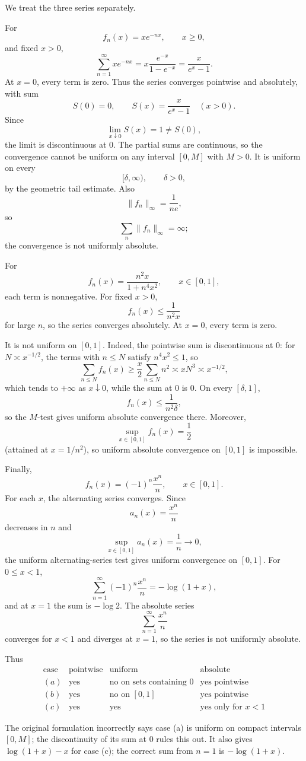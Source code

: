 \begin{solution}
We treat the three series separately.

For
\[
f_n(x)=xe^{-nx},
\qquad x\ge0,
\]
and fixed \(x>0\),
\[
\sum_{n=1}^{\infty}xe^{-nx}
=
x\frac{e^{-x}}{1-e^{-x}}
=
\frac{x}{e^x-1}.
\]
At \(x=0\), every term is zero. Thus the series converges pointwise and absolutely, with sum
\[
S(0)=0,
\qquad
S(x)=\frac{x}{e^x-1}\quad(x>0).
\]
Since
\[
\lim_{x\downarrow0}S(x)=1\neq S(0),
\]
the limit is discontinuous at \(0\). The partial sums are continuous, so the convergence
cannot be uniform on any interval \([0,M]\) with \(M>0\). It is uniform on every
\[
[\delta,\infty),
\qquad \delta>0,
\]
by the geometric tail estimate. Also
\[
\|f_n\|_\infty=\frac1{ne},
\]
so
\[
\sum_n\|f_n\|_\infty=\infty;
\]
the convergence is not uniformly absolute.

For
\[
f_n(x)
=
\frac{n^2x}{1+n^4x^2},
\qquad
x\in[0,1],
\]
each term is nonnegative. For fixed \(x>0\),
\[
f_n(x)
\le
\frac1{n^2x}
\]
for large \(n\), so the series converges absolutely. At \(x=0\), every term is zero.

It is not uniform on \([0,1]\). Indeed, the pointwise sum is discontinuous at \(0\): for
\(N\asymp x^{-1/2}\), the terms with \(n\le N\) satisfy \(n^4x^2\le1\), so
\[
\sum_{n\le N}f_n(x)
\ge
\frac{x}{2}\sum_{n\le N}n^2
\asymp
xN^3
\asymp
x^{-1/2},
\]
which tends to \(+\infty\) as \(x\downarrow0\), while the sum at \(0\) is \(0\).
On every \([\delta,1]\),
\[
f_n(x)\le\frac1{n^2\delta},
\]
so the \(M\)-test gives uniform absolute convergence there.
Moreover,
\[
\sup_{x\in[0,1]}f_n(x)=\frac12
\]
(attained at \(x=1/n^2\)), so uniform absolute convergence on \([0,1]\) is impossible.

Finally,
\[
f_n(x)=(-1)^n\frac{x^n}{n},
\qquad
x\in[0,1].
\]
For each \(x\), the alternating series converges. Since
\[
a_n(x)=\frac{x^n}{n}
\]
decreases in \(n\) and
\[
\sup_{x\in[0,1]}a_n(x)=\frac1n\to0,
\]
the uniform alternating-series test gives uniform convergence on \([0,1]\).
For \(0\le x<1\),
\[
\sum_{n=1}^{\infty}(-1)^n\frac{x^n}{n}
=
-\log(1+x),
\]
and at \(x=1\) the sum is \(-\log2\).
The absolute series
\[
\sum_{n=1}^{\infty}\frac{x^n}{n}
\]
converges for \(x<1\) and diverges at \(x=1\), so the series is not uniformly absolute.

Thus
\[
\boxed{
\begin{array}{c|c|c|c}
\text{case}&\text{pointwise}&\text{uniform}&\text{absolute}\\ \hline
(a)&\text{yes}&\text{no on sets containing }0&\text{yes pointwise}\\
(b)&\text{yes}&\text{no on }[0,1]&\text{yes pointwise}\\
(c)&\text{yes}&\text{yes}&\text{yes only for }x<1
\end{array}}
\]

The original formulation incorrectly says case (a) is uniform on compact intervals \([0,M]\);
the discontinuity of its sum at \(0\) rules this out. It also gives
\(\log(1+x)-x\) for case (c); the correct sum from \(n=1\) is \(-\log(1+x)\).
\end{solution}


